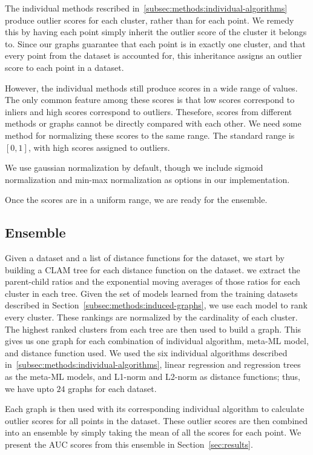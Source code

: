 The individual methods rescribed in~\ref{subsec:methods:individual-algorithms} produce outlier scores for each cluster, rather than for each point.
We remedy this by having each point simply inherit the outlier score of the cluster it belongs to.
Since our graphs guarantee that each point is in exactly one cluster, and that every point from the dataset is accounted for, this inheritance assigns an outlier score to each point in a dataset.

However, the individual methods still produce scores in a wide range of values.
The only common feature among these scores is that low scores correspond to inliers and high scores correspond to outliers.
Thesefore, scores from different methods or graphs cannot be directly compared with each other.
We need some method for normalizing these scores to the same range.
The standard range is $[0, 1]$, with high scores assigned to outliers.

We use gaussian normalization by default, though we include sigmoid normalization and min-max normalization as options in our implementation.


Once the scores are in a uniform range, we are ready for the ensemble.


\subsection{Ensemble}
\label{subsec:methods:ensemble}

Given a dataset and a list of distance functions for the dataset, we start by building a CLAM tree for each distance function on the dataset.
we extract the parent-child ratios and the exponential moving averages of those ratios for each cluster in each tree.
Given the set of models learned from the training datasets described in Section~\ref{subsec:methods:induced-graphs}, we use each model to rank every cluster.
These rankings are normalized by the cardinality of each cluster.
The highest ranked clusters from each tree are then used to build a graph.
This gives us one graph for each combination of individual algorithm, meta-ML model, and distance function used.
We used the six individual algorithms described in~\ref{subsec:methods:individual-algorithms}, linear regression and regression trees as the meta-ML models, and L1-norm and L2-norm as distance functions;
thus, we have upto $24$ graphs for each dataset.

Each graph is then used with its corresponding individual algorithm to calculate outlier scores for all points in the dataset.
These outlier scores are then combined into an ensemble by simply taking the mean of all the scores for each point.
We present the AUC scores from this ensemble in Section~\ref{sec:results}.

